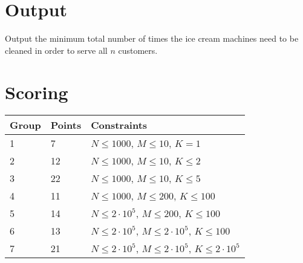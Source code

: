 \section*{Output}
Output the minimum total number of times the ice cream machines need to be
cleaned in order to serve all $n$ customers.

\section*{Scoring}
\begin{tabular}{|l|l|l|}
    \hline
    Group & Points & Constraints \\ \hline
    1     &  7   & $N \leq 1000$,          $M \leq 10$, $K = 1$ \\ \hline %
    2     &  12  & $N \leq 1000$,          $M \leq 10$, $K \leq 2$ \\ \hline %
    3     &  22  & $N \leq 1000$,          $M \leq 10$, $K \leq 5$ \\ \hline %
    4     &  11  & $N \leq 1000$,         $M \leq 200$, $K \leq 100$ \\ \hline %
    5     &  14  & $N \leq 2 \cdot 10^5$, $M \leq 200$, $K \leq 100$ \\ \hline %
    6     &  13  & $N \leq 2 \cdot 10^5$, $M \leq 2 \cdot 10^5$, $K \leq 100$ \\ \hline %
    7     &  21  & $N \leq 2 \cdot 10^5$, $M \leq 2 \cdot 10^5$, $K \leq 2 \cdot 10^5$ \\ \hline %
\end{tabular}

